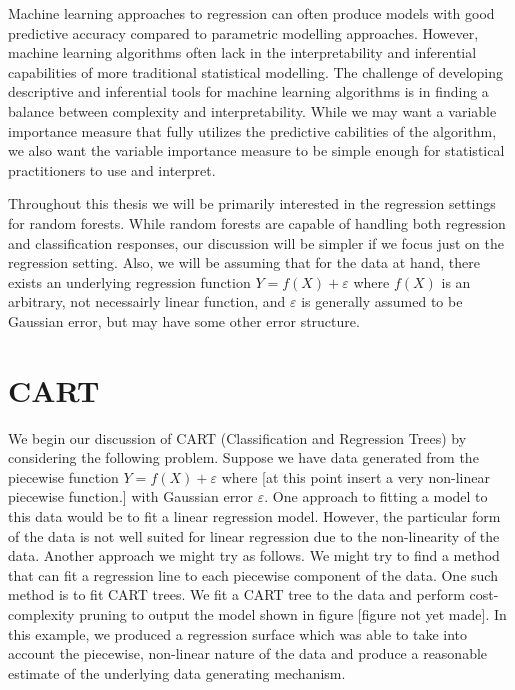\documentclass[12pt,twoside]{reedthesis}
\theoremstyle{definition}
\theoremstyle{definition}
\theoremstyle{definition}
\theoremstyle{remark}
\begin{document}
Machine learning approaches to regression can often produce models with
good predictive accuracy compared to parametric modelling approaches.
However, machine learning algorithms often lack in the interpretability
and inferential capabilities of more traditional statistical modelling.
The challenge of developing descriptive and inferential tools for
machine learning algorithms is in finding a balance between complexity
and interpretability. While we may want a variable importance measure
that fully utilizes the predictive cabilities of the algorithm, we also
want the variable importance measure to be simple enough for statistical
practitioners to use and interpret. \par

Throughout this thesis we will be primarily interested in the regression
settings for random forests. While random forests are capable of
handling both regression and classification responses, our discussion
will be simpler if we focus just on the regression setting. Also, we
will be assuming that for the data at hand, there exists an underlying
regression function \(Y=f(X)+\varepsilon\) where \(f(X)\) is an
arbitrary, not necessairly linear function, and \(\varepsilon\) is
generally assumed to be Gaussian error, but may have some other error
structure. \par

\section{CART}\label{cart}

We begin our discussion of CART (Classification and Regression Trees) by
considering the following problem. Suppose we have data generated from
the piecewise function \(Y=f(X)+\varepsilon\) where {[}at this point
insert a very non-linear piecewise function.{]} with Gaussian error
\(\varepsilon\). One approach to fitting a model to this data would be
to fit a linear regression model. However, the particular form of the
data is not well suited for linear regression due to the non-linearity
of the data. Another approach we might try as follows. We might try to
find a method that can fit a regression line to each piecewise component
of the data. One such method is to fit CART trees. We fit a CART tree to
the data and perform cost-complexity pruning to output the model shown
in figure {[}figure not yet made{]}. In this example, we produced a
regression surface which was able to take into account the piecewise,
non-linear nature of the data and produce a reasonable estimate of the
underlying data generating mechanism. \par
\end{document}
